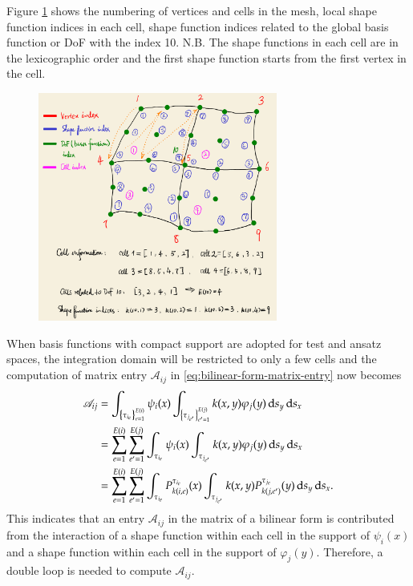 \documentclass[11pt, a4paper]{article}
\begin{document}
Figure \ref{fig:local-shape-function-and-global-dof} shows the numbering of vertices and
cells in the mesh, local shape function indices in each cell, shape function indices
related to the global basis function or DoF with the index 10. N.B. The shape functions in
each cell are in the lexicographic order and the first shape function starts from the
first vertex in the cell.
\begin{figure}[htbp]
  \centering
  \includegraphics[width=0.7\textwidth, height=\textheight, keepaspectratio]{figures/shape-function-index-and-global-dof-index-draft}
  \caption{}
  \label{fig:local-shape-function-and-global-dof}
\end{figure}

When basis functions with compact support are adopted for test and ansatz spaces, the
integration domain will be restricted to only a few cells and the
computation of matrix entry $\mathscr{A}_{ij}$ in \eqref{eq:bilinear-form-matrix-entry}
now becomes
\begin{equation}
  \label{eq:bilinear-form-matrix-entry-cell-pairs}
  \begin{aligned}
    \mathscr{A}_{ij} &= \int_{\left\{ \tau_{i_{e}} \right\}_{e=1}^{E(i)}} \psi_i(x)
    \int_{\left\{ \tau_{j_{e'}} \right\}_{e'=1}^{E(j)}} k(x,y)\varphi_j(y) \,\mathrm{d} s_y \,\mathrm{d}
    s_x \\
    &= \sum_{e=1}^{E(i)} \sum_{e'=1}^{E(j)} \int_{\tau_{i_e}} \psi_i(x)
  \int_{\tau_{j_{e'}}} k(x,y)\varphi_j(y) \,\mathrm{d} s_y \,\mathrm{d} s_x \\
    &= \sum_{e=1}^{E(i)} \sum_{e'=1}^{E(j)} \int_{\tau_{i_e}} P_{k(i,e)}^{\tau_{i_e}}(x)
  \int_{\tau_{j_{e'}}} k(x,y) P_{k(j,e')}^{\tau_{j_e}}(y) \,\mathrm{d} s_y \,\mathrm{d} s_x.
  \end{aligned}
\end{equation}
This indicates that an entry $\mathscr{A}_{ij}$ in the matrix of a bilinear form is
 contributed from the interaction of a shape function within each cell in the support of $\psi_i(x)$ and a shape function within each cell in the support of $\varphi_j(y)$. Therefore, a double loop is needed to compute $\mathscr{A}_{ij}$.
\end{document}
